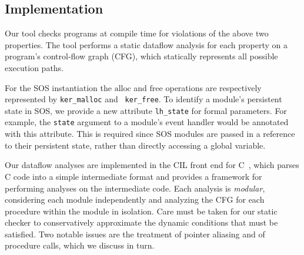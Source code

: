 % 
% 
% 


\subsection{Implementation}

Our tool checks programs at compile time for violations of the above
two properties.  The tool performs a static dataflow analysis for each
property on a program's control-flow graph (CFG), which statically
represents all possible execution paths.  

For the SOS instantiation the $\mathrm{alloc}$ and $\mathrm{free}$
operations are respectively represented by {\tt ker\_malloc} and {\tt
ker\_free}.  To identify a module's persistent state in SOS, we
provide a new attribute {\tt lh\_state} for formal parameters.  For
example, the {\tt state} argument to a module's event handler would be
annotated with this attribute.  This is required since SOS modules are
passed in a reference to their persistent state, rather than directly accessing a
global variable.

Our dataflow analyses are implemented in the CIL front end for
C~\cite{CIL}, which parses C code into a simple intermediate format
and provides a framework for performing analyses on the intermediate
code.  Each analysis is {\em modular}, considering each module
independently and analyzing the CFG for each procedure within the
module in isolation.  Care must be taken for our static checker to
conservatively approximate the dynamic conditions that must be
satisfied.  Two notable issues are the treatment of pointer aliasing
and of procedure calls, which we discuss in turn.

